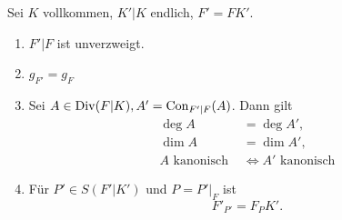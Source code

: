 \begin{satz}
    Sei $K$ vollkommen, $K'|K$ endlich, $F'=FK'$.
    \begin{enumerate}[label=(\alph*)]
        \item $F'|F$ ist unverzweigt.
        \item $g_{F'} = g_{F}$
        \item Sei $A \in \operatorname{Div}(F|K), A' = \operatorname{Con}_{F'|F}(A)$. Dann gilt
        \begin{align*}
            \deg A & = \deg A',\\
            \dim A & = \dim A',\\
            A \text{ kanonisch } & \iff A' \text{ kanonisch}
        \end{align*}

        \item Für $P' \in S(F'|K')$ und $P=P'|_F$ ist
        $$ F'_{P'} = F_PK'.$$
    \end{enumerate}
\end{satz}
